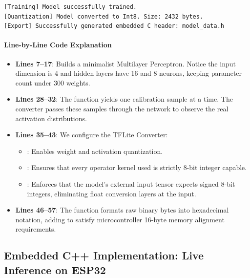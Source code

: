 \begin{lstlisting}[style=outputstyle, caption={Output of the Python quantization and C header export script.}]
[Training] Model successfully trained.
[Quantization] Model converted to Int8. Size: 2432 bytes.
[Export] Successfully generated embedded C header: model_data.h
\end{lstlisting}

\paragraph{Line-by-Line Code Explanation}
\begin{itemize}
    \item \textbf{Lines 7--17}: Builds a minimalist Multilayer Perceptron. Notice the input dimension is 4 and hidden layers have 16 and 8 neurons, keeping parameter count under 300 weights.
    \item \textbf{Lines 28--32}: The  function yields one calibration sample at a time. The converter passes these samples through the network to observe the real activation distributions.
    \item \textbf{Lines 35--43}: We configure the TFLite Converter:
    \begin{itemize}
        \item {}: Enables weight and activation quantization.
        \item {}: Ensures that every operator kernel used is strictly 8-bit integer capable.
        \item {}: Enforces that the model's external input tensor expects signed 8-bit integers, eliminating float conversion layers at the input.
    \end{itemize}
    \item \textbf{Lines 46--57}: The  function formats raw binary bytes into hexadecimal notation, adding  to satisfy microcontroller 16-byte memory alignment requirements.
\end{itemize}

\subsection{Embedded C++ Implementation: Live Inference on ESP32}\label{subsec:embedded_cpp}

